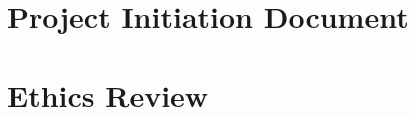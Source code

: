 \documentclass[12pt, a4paper]{report}
\begin{document}

\newpage






% 
% 





% 

% 







\begin{appendices}
  \newpage

  \chapter{Project Initiation Document}
   \label{appendix:AppendixPID}

  \chapter{Ethics Review}
  
\end{appendices}

\newpage
{}
{}
\printbibliography
\end{document}
